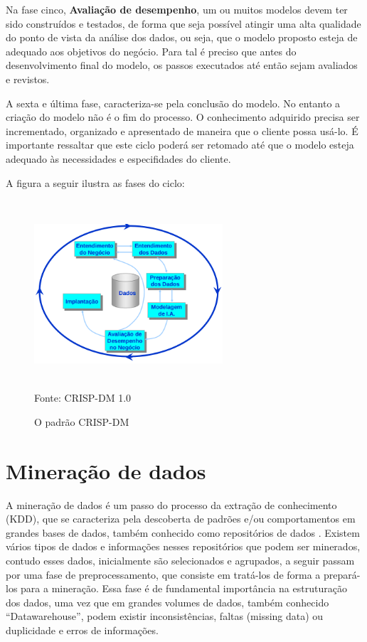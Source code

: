 Na fase cinco, \textbf{Avaliação de desempenho}, um ou muitos modelos devem ter sido construídos e testados, 
de forma que seja possível atingir uma alta qualidade do ponto de vista da análise dos dados, ou seja, que o 
modelo proposto esteja de adequado aos objetivos do negócio. Para tal é preciso que antes do desenvolvimento final 
do modelo, os passos executados até então sejam avaliados e revistos.

A sexta e última fase, caracteriza-se pela conclusão do modelo. No entanto a criação do modelo não é o fim do processo.
O conhecimento adquirido precisa ser incrementado, organizado e apresentado de maneira que o cliente possa usá-lo.
É importante ressaltar que este ciclo poderá ser retomado até que o modelo esteja adequado às necessidades e especifidades do cliente.

A figura a seguir ilustra as fases do ciclo:

\begin{figure}[!ht]
\centering
\caption{O padrão CRISP-DM \cite{Crisp2000}}
\vspace{1mm}
\includegraphics[width=70mm, height=70mm]{Figuras/BigData/CrispDM.png}\\
\tiny Fonte: CRISP-DM 1.0
\end{figure}




\pagebreak


\section{Mineração de dados}

A mineração de dados é um passo do processo da extração de conhecimento (KDD), que se caracteriza pela descoberta de padrões e/ou comportamentos em grandes bases de dados, 
também conhecido como repositórios de dados \cite{FayyadUeoutros}.
Existem vários tipos de dados e informações nesses repositórios que podem ser minerados, contudo esses dados, inicialmente são selecionados e agrupados, a seguir passam por 
uma fase de preprocessamento, que consiste em tratá-los de forma a prepará-los para a mineração. Essa fase é de 
fundamental importância na estruturação dos dados, uma vez que em grandes volumes de dados, também conhecido ``Datawarehouse'', podem existir inconsistências, faltas (missing data) ou 
duplicidade e erros de informações.

